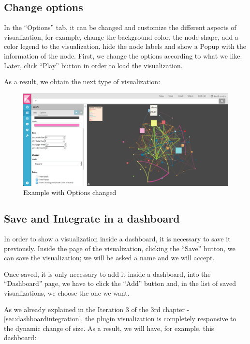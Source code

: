 \documentclass[a4paper, 12pt]{book}
\begin{document}
\subsection{Change options}

In the “Options” tab, it can be changed and customize the different aspects of visualization, for example, change the background color, the node shape, add a color legend to the visualization, hide the node labels and show a Popup with the information of the node. First, we change the options according to what we like. Later, click “Play” button in order to load the visualization.

As a result, we obtain the next type of visualization:

\begin{figure}[H]
  \centering
  \includegraphics[width=16cm, keepaspectratio]{img/results/optionschanged}
  \caption{Example with Options changed}
  \label{fig:optionschanged}
\end{figure}

\subsection{Save and Integrate in a dashboard}

In order to show a visualization inside a dashboard, it is necessary to save it previously. Inside the page of the visualization, clicking the “Save” button, we can save the visualization; we will be asked a name and we will accept.

Once saved, it is only necessary to add it inside a dashboard, into the “Dashboard” page, we have to click the “Add” button and, in the list of saved visualizations, we choose the one we want.

As we already explained in the Iteration 3 of the 3rd chapter - \ref{sec:dashboardintegration}, the plugin visualization is completely responsive to the dynamic change of size. As a result, we will have, for example, this dashboard:
\end{document}
